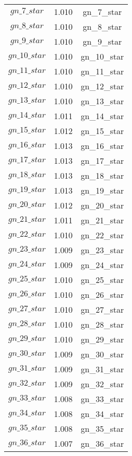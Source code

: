 \begin{center}
\begin{longtable}{ccc}
$gn\_7\_star$ 	 & 	 1.010 	 & 	 gn\_7\_star\\
$gn\_8\_star$ 	 & 	 1.010 	 & 	 gn\_8\_star\\
$gn\_9\_star$ 	 & 	 1.010 	 & 	 gn\_9\_star\\
$gn\_10\_star$ 	 & 	 1.010 	 & 	 gn\_10\_star\\
$gn\_11\_star$ 	 & 	 1.010 	 & 	 gn\_11\_star\\
$gn\_12\_star$ 	 & 	 1.010 	 & 	 gn\_12\_star\\
$gn\_13\_star$ 	 & 	 1.010 	 & 	 gn\_13\_star\\
$gn\_14\_star$ 	 & 	 1.011 	 & 	 gn\_14\_star\\
$gn\_15\_star$ 	 & 	 1.012 	 & 	 gn\_15\_star\\
$gn\_16\_star$ 	 & 	 1.013 	 & 	 gn\_16\_star\\
$gn\_17\_star$ 	 & 	 1.013 	 & 	 gn\_17\_star\\
$gn\_18\_star$ 	 & 	 1.013 	 & 	 gn\_18\_star\\
$gn\_19\_star$ 	 & 	 1.013 	 & 	 gn\_19\_star\\
$gn\_20\_star$ 	 & 	 1.012 	 & 	 gn\_20\_star\\
$gn\_21\_star$ 	 & 	 1.011 	 & 	 gn\_21\_star\\
$gn\_22\_star$ 	 & 	 1.010 	 & 	 gn\_22\_star\\
$gn\_23\_star$ 	 & 	 1.009 	 & 	 gn\_23\_star\\
$gn\_24\_star$ 	 & 	 1.009 	 & 	 gn\_24\_star\\
$gn\_25\_star$ 	 & 	 1.010 	 & 	 gn\_25\_star\\
$gn\_26\_star$ 	 & 	 1.010 	 & 	 gn\_26\_star\\
$gn\_27\_star$ 	 & 	 1.010 	 & 	 gn\_27\_star\\
$gn\_28\_star$ 	 & 	 1.010 	 & 	 gn\_28\_star\\
$gn\_29\_star$ 	 & 	 1.010 	 & 	 gn\_29\_star\\
$gn\_30\_star$ 	 & 	 1.009 	 & 	 gn\_30\_star\\
$gn\_31\_star$ 	 & 	 1.009 	 & 	 gn\_31\_star\\
$gn\_32\_star$ 	 & 	 1.009 	 & 	 gn\_32\_star\\
$gn\_33\_star$ 	 & 	 1.008 	 & 	 gn\_33\_star\\
$gn\_34\_star$ 	 & 	 1.008 	 & 	 gn\_34\_star\\
$gn\_35\_star$ 	 & 	 1.008 	 & 	 gn\_35\_star\\
$gn\_36\_star$ 	 & 	 1.007 	 & 	 gn\_36\_star\\

\end{longtable}
\end{center}

